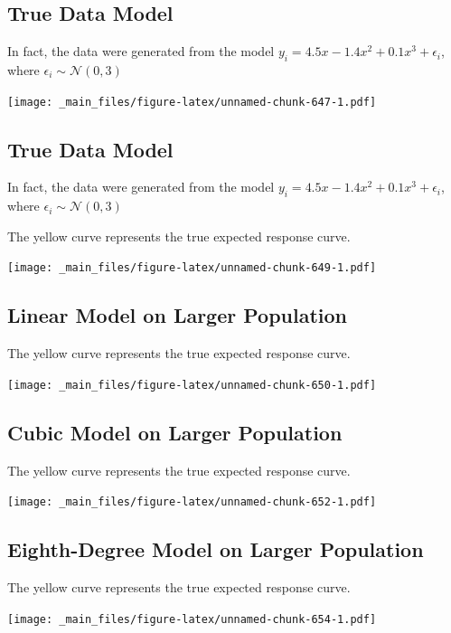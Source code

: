 \documentclass[]{book}
\begin{document}
\subsection{True Data Model}\label{true-data-model}

In fact, the data were generated from the model
\(y_i = 4.5x - 1.4x^2 + 0.1x^3 + \epsilon_i\), where
\(\epsilon_i\sim\mathcal{N}(0,3)\)

\texttt{[image: \_main\_files/figure-latex/unnamed-chunk-647-1.pdf]}

\subsection{True Data Model}\label{true-data-model-1}

In fact, the data were generated from the model
\(y_i = 4.5x - 1.4x^2 + 0.1x^3 + \epsilon_i\), where
\(\epsilon_i\sim\mathcal{N}(0,3)\)

The yellow curve represents the true expected response curve.

\texttt{[image: \_main\_files/figure-latex/unnamed-chunk-649-1.pdf]}

\subsection{Linear Model on Larger
Population}\label{linear-model-on-larger-population}

The yellow curve represents the true expected response curve.

\texttt{[image: \_main\_files/figure-latex/unnamed-chunk-650-1.pdf]}

\subsection{Cubic Model on Larger
Population}\label{cubic-model-on-larger-population}

The yellow curve represents the true expected response curve.

\texttt{[image: \_main\_files/figure-latex/unnamed-chunk-652-1.pdf]}

\subsection{Eighth-Degree Model on Larger
Population}\label{eighth-degree-model-on-larger-population}

The yellow curve represents the true expected response curve.

\texttt{[image: \_main\_files/figure-latex/unnamed-chunk-654-1.pdf]}
\end{document}
